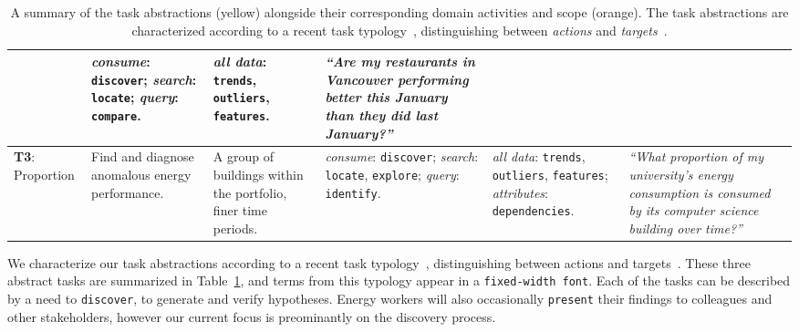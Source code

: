 \documentclass[journal]{vgtc}                %
\begin{document}
\begin{table}[ht]
\begin{center}
\begin{tabular}{p{}|>{\RaggedRight}p{}|>{\RaggedRight}p{}|>{\RaggedRight}p{}|>{\RaggedRight}p{}|>{\RaggedRight}p{}}
        & {\it consume}: {\tt discover}; {\it search}: {\tt locate}; {\it query}: {\tt compare}. 
        
        & {\it all data}: {\tt trends}, {\tt outliers}, {\tt features}.
        
        & {\it ``Are my restaurants in Vancouver performing better this January than they did last January?''}
        
        \\
        
        \hline
        
        \cellcolor{nmYellow} {\bf T3}: Proportion 
        
        & \cellcolor{nmOrange} Find and diagnose anomalous energy performance. 
        
        & \cellcolor{nmOrange} A group of buildings within the portfolio, finer time periods. 
        
        & {\it consume}: {\tt discover}; {\it search}: {\tt locate}, {\tt explore}; {\it query}: {\tt identify}. 
        
        & {\it all data}: {\tt trends}, {\tt outliers}, {\tt features}; {\it attributes}: {\tt dependencies}. 
        
        & {\it ``What proportion of my university's energy consumption is consumed by its computer science building over time?''}
        
        \\
        
        \hline  
        
    \end{tabular}
    \vspace{-0.3cm}
    \caption{A summary of the task abstractions (yellow) alongside their corresponding domain activities and scope (orange). The task abstractions are characterized according to a recent task typology~\cite{Brehmer2013}, distinguishing between \textsl{actions} and \textsl{targets}~\cite{Munzner2014}.}
    \label{tab:task-abstractions}
    \end{center}
    \vspace{-0.9cm}
\end{table}

We characterize our task abstractions according to a recent task typology~\cite{Brehmer2013}, distinguishing between actions and targets~\cite{Munzner2014}. 
These three abstract tasks are summarized in Table~\ref{tab:task-abstractions}, and terms from this typology appear in a {\tt fixed-width font}.
Each of the tasks can be described by a need to {\tt discover}, to generate and verify hypotheses.
Energy workers will also occasionally {\tt present} their findings to colleagues and other stakeholders, however our current focus is preominantly on the discovery process. 
\end{document}
